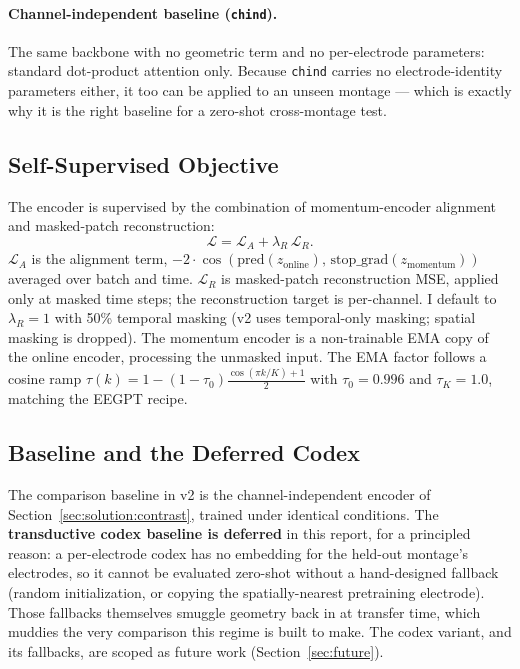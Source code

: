 \documentclass[11pt]{article}
\begin{document}
\paragraph{Channel-independent baseline (\texttt{chind}).}
The same backbone with no geometric term and no per-electrode parameters:
standard dot-product attention only. Because \texttt{chind} carries no
electrode-identity parameters either, it too can be applied to an unseen
montage --- which is exactly why it is the right baseline for a zero-shot
cross-montage test.

\subsection{Self-Supervised Objective}
\label{sec:solution:loss}

The encoder is supervised by the combination of momentum-encoder alignment
and masked-patch reconstruction:
\begin{equation}
  \mathcal{L} = \mathcal{L}_A + \lambda_R\, \mathcal{L}_R.
  \label{eq:loss}
\end{equation}
$\mathcal{L}_A$ is the alignment term,
$-2 \cdot \cos(\mathrm{pred}(z_\text{online}),\,\mathrm{stop\_grad}(z_\text{momentum}))$
averaged over batch and time. $\mathcal{L}_R$ is masked-patch reconstruction
MSE, applied only at masked time steps; the reconstruction target is
per-channel. I default to $\lambda_R = 1$ with 50\% temporal masking (v2 uses
temporal-only masking; spatial masking is dropped). The momentum encoder is a
non-trainable EMA copy of the online encoder, processing the unmasked input.
The EMA factor follows a cosine ramp
$\tau(k) = 1 - (1 - \tau_0)\frac{\cos(\pi k / K) + 1}{2}$ with
$\tau_0 = 0.996$ and $\tau_K = 1.0$, matching the EEGPT recipe.

\subsection{Baseline and the Deferred Codex}
\label{sec:solution:baseline}

The comparison baseline in v2 is the channel-independent encoder of
Section~\ref{sec:solution:contrast}, trained under identical conditions. The
\textbf{transductive codex baseline is deferred} in this report, for a
principled reason: a per-electrode codex has no embedding for the held-out
montage's electrodes, so it cannot be evaluated zero-shot without a
hand-designed fallback (random initialization, or copying the
spatially-nearest pretraining electrode). Those fallbacks themselves smuggle
geometry back in at transfer time, which muddies the very comparison this
regime is built to make. The codex variant, and its fallbacks, are scoped as
future work (Section~\ref{sec:future}).
\end{document}

